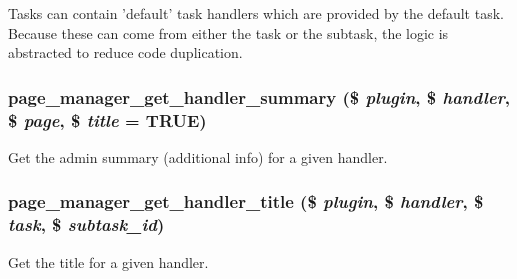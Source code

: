Tasks can contain 'default' task handlers which are provided by the default task. Because these can come from either the task or the subtask, the logic is abstracted to reduce code duplication. \hypertarget{page__manager_8module_ae7a8599be04f7e436e1e1ab1cad2b67b}{
\subsubsection[{page\_\-manager\_\-get\_\-handler\_\-summary}]{\setlength{\rightskip}{0pt plus 5cm}page\_\-manager\_\-get\_\-handler\_\-summary (\$ {\em plugin}, \/  \$ {\em handler}, \/  \$ {\em page}, \/  \$ {\em title} = {\ttfamily TRUE})}}
\label{page__manager_8module_ae7a8599be04f7e436e1e1ab1cad2b67b}
Get the admin summary (additional info) for a given handler. \hypertarget{page__manager_8module_a9b8d0b4e30a8e5e7111bf5a1784c629a}{
\subsubsection[{page\_\-manager\_\-get\_\-handler\_\-title}]{\setlength{\rightskip}{0pt plus 5cm}page\_\-manager\_\-get\_\-handler\_\-title (\$ {\em plugin}, \/  \$ {\em handler}, \/  \$ {\em task}, \/  \$ {\em subtask\_\-id})}}
\label{page__manager_8module_a9b8d0b4e30a8e5e7111bf5a1784c629a}
Get the title for a given handler.

